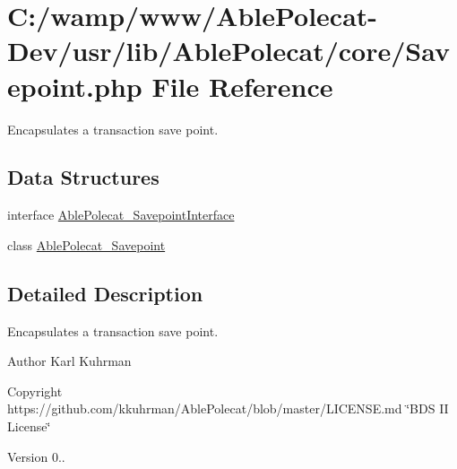 \hypertarget{_savepoint_8php}{}\section{C\+:/wamp/www/\+Able\+Polecat-\/\+Dev/usr/lib/\+Able\+Polecat/core/\+Savepoint.php File Reference}
\label{_savepoint_8php}


Encapsulates a transaction save point.  


\subsection*{Data Structures}
\begin{DoxyCompactItemize}
\item 
interface \hyperlink{interface_able_polecat___savepoint_interface}{Able\+Polecat\+\_\+\+Savepoint\+Interface}
\item 
class \hyperlink{class_able_polecat___savepoint}{Able\+Polecat\+\_\+\+Savepoint}
\end{DoxyCompactItemize}


\subsection{Detailed Description}
Encapsulates a transaction save point. 

\begin{DoxyAuthor}{Author}
Karl Kuhrman 
\end{DoxyAuthor}
\begin{DoxyCopyright}{Copyright}
https\+://github.com/kkuhrman/\+Able\+Polecat/blob/master/\+L\+I\+C\+E\+N\+S\+E.\+md \char`\"{}\+B\+D\+S I\+I License\char`\"{} 
\end{DoxyCopyright}
\begin{DoxyVersion}{Version}
0.. 
\end{DoxyVersion}
